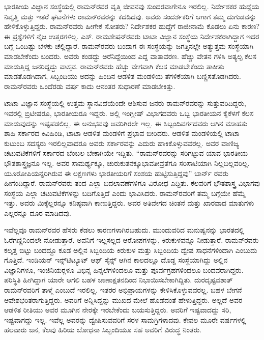 ಭಾರತೀಯ ವಿಜ್ಞಾನ ಸಂಸ್ಥೆಯಲ್ಲಿ ರಾಮನ್‍ರವರ ವೃತ್ತಿ ಜೀವನವು ಸುಂದರವಾಗೇನೂ ಇರಲಿಲ್ಲ. ನಿರ್ದೇಶಕರ ಹುದ್ದೆಯ ನಿವೃತ್ತಿ ಮತ್ತು ಇತರೆ ಘಟನೆಗಳು ರಾಮನ್‍ರವರನ್ನು ಕದಡಿದವು. ಅವರು ಸಂದರ್ಶಕರಿಗೆ ಆಗಾಗ ತಮ್ಮ ದುಗುಡವನ್ನು ಹೇಳಿಕೊಳ್ಳುತ್ತಿದ್ದರು. ರಾಮನ್‍ರವರು ಹೀಗೇಕೆ ಸೋತರು? ನಿರ್ದೇಶಕರ ಹುದ್ದೆಗೆ ರಾಜೀನಾಮೆ ಕೊಡಲು ಏನು ಕಾರಣ? ಈ ಪ್ರಶ್ನೆಗಳಿಗೆ ನೈಜ ಉತ್ತರಗಳಿಲ್ಲ. ಎಸ್. ರಾಮಶೇಷನ್‍ರವರು ಟಾಟಾ ವಿಜ್ಞಾನ ಸಂಸ್ಥೆಯ ನಿರ್ದೇಶಕರಾಗಿದ್ದಾಗ ಇದರ ಬಗ್ಗೆ ಒಂದಿಷ್ಟು ಬೆಳಕು ಚೆಲ್ಲಿದ್ದಾರೆ. ರಾಮನ್‍ರವರು ಬಂದಾಗ ಈ ಸಂಸ್ಥೆಯನ್ನು ಜಗತ್ತಿನಲ್ಲೇ ಅತ್ಯುತ್ತಮ ಸಂಸ್ಥೆಯಾಗಿ ಮಾಡಬೇಕೆಂದು ಬಂದರು. ಅವರು ಕಂಡದ್ದು ಅರೆನಿದ್ದೆಯಿಂದ ಎದ್ದ ವಾತಾವರಣ. ಹೆಚ್ಚು ವೇತನ ಗಳಿಸಿ ಅತ್ಯಲ್ಪ ಕೆಲಸ ಮಾಡುತ್ತಿದ್ದ ಜನರಿದ್ದದ್ದು ವಾಸ್ತವ. ರಾಮನ್‍ರವರು ಹೆಚ್ಚು ವೇಗವಾಗಿ ಕೆಲಸ ಮಾಡಬೇಕೆಂದು ತಾಕೀತು ಮಾಡತೊಡಗಿದಾಗ, ಸಿಬ್ಬಂದಿಯು ಅದನ್ನು ಹಿಂದಿನ ಆಡಳಿತ ಮಂಡಳಿಯ ತೆಗಳಿಕೆಯಾಗಿ ಬಣ್ಣಿಸತೊಡಗಿದರು. ರಾಮನ್‍ರವರು ಒಂದೆರಡು ವರ್ಷ ಕಾದು ಆನಂತರ ಸುಧಾರಣೆ ಮಾಡಬೇಕಿತ್ತು.

ಟಾಟಾ ವಿಜ್ಞಾನ ಸಂಸ್ಥೆಯಲ್ಲಿ ಉತ್ತಮ ಸ್ಥಾನವಿದೆಯೆಂದೇ ಆಶಿಸುವ ಜನರು ರಾಮನ್‍ರವರನ್ನು ಸುತ್ತುವರಿದಿದ್ದರು, ಇವರಲ್ಲಿ ಬ್ರಿಟೀಷರೂ, ಭಾರತೀಯರೂ ಇದ್ದರು. ಅಲ್ಲಿ ಇಂಗ್ಲೀಷ್ ವಿಭಾಗದವರು ಒಬ್ಬ ಭಾರತೀಯನ ಕೈಕೆಳಗೆ ಕೆಲಸ ಮಾಡುವುದನ್ನು ಇಷ್ಟಪಡಲಿಲ್ಲ. ಈ ಅನುಭವವು ಅವರಿಗಿರಲೇ ಇಲ್ಲ. ಈ ಸಿಬ್ಬಂದಿವರ್ಗದವರು ಆಗಿನ ವಸಾಹತು ಶಾಹಿ ಸರ್ಕಾರದ ಕಿವಿಹಿಂಡಿ, ಟಾಟಾ ಆಡಳಿತ ಮಂಡಳಿಗೆ ಪ್ರಭಾವ ಬೀರಿದರು. ಆಡಳಿತ ಮಂಡಳಿಯಲ್ಲಿ ಟಾಟಾ ಕುಟುಂಬ ಸದಸ್ಯರು ಇರಲಿಲ್ಲವಾದರೂ ಅವರು ಸರ್ಕಾರವನ್ನು ಎದುರು ಹಾಕಿಕೊಳ್ಳುವವರಲ್ಲ. ಅವರ ವಾಣಿಜ್ಯ ಚಟುವಟಿಕೆಗಳಿಗೆ ಸರ್ಕಾರದ ಬೆಂಬಲ ಬೇಕಾಗಿಯೇ ಇದ್ದಿತು. “ರಾಮನ್‍ರವರನ್ನು ಸರಿಗಟ್ಟುವ ಯಾವ ಭಾರತೀಯ ಭೌತಶಾಸ್ತ್ರಜ್ಞನೂ ಇಲ್ಲ. ಅವರ ಸಾಮರ್ಥ್ಯಕ್ಕೂ, ಚುರುಕುತನಕ್ಕೂ\break ಭಾವತೀವ್ರತೆಗೂ ಸರಿಸಾಟಿಯಾಗಿ ನಿಲ್ಲಬಲ್ಲವರಿಲ್ಲ. ಯೂರೋಪಿಯನ್ನರಿಗಿರುವ ಈ ಲಕ್ಷಣಗಳು ಭಾರತೀಯರಿಗೆ ಸಂಶಯ ಹುಟ್ಟಿಸುತ್ತಿದ್ದವು”  ಬಾರ್ನ್ ರವರು ಹೀಗೆಂದಿದ್ದಾರೆ. ರಾಮನ್‍ರವರು ತಂದ ಎಲ್ಲಾ ಬದಲಾವಣೆಗಳಿಗೂ ವಿರೋಧ ಎದ್ದಿತು. ಕೆಲವರಿಗೆ ಭೌತಶಾಸ್ತ್ರ ವಿಭಾಗವು ಸಂಸ್ಥೆಯ ಎಲ್ಲಾ ಚಟುವಟಿಕೆಗಳನ್ನು ಬದಿಗೊತ್ತಿದೆ ಎಂದು ಭಾವಿಸಿದರು. ರಾಮನ್‍ರವರಿಗೆ ತಮ್ಮ ಬಗ್ಗೆಯೇ ಹೆಮ್ಮೆ ಇತ್ತು. ಅವರು ಮಿಕ್ಕೆಲ್ಲರನ್ನೂ ಕನಿಷ್ಠವಾಗಿ ಕಾಣುತ್ತಿದ್ದರು. ಅವರ ಅತಿವೇಗದ ಚಿಂತನೆ ಮತ್ತು ಖಾರವಾದ ಮಾತುಗಳು ಎಲ್ಲರನ್ನೂ ದೂರ ಮಾಡಿದವು.

ಇವೆಲ್ಲವೂ ರಾಮನ್‍ರವರ ಹೆಸರು ಕೆಡಲು ಕಾರಣಗಳಾಗಿರಬಹುದು. ಮುಂದುವರಿದ ಮನುಷ್ಯನನ್ನು ಭಾರತದಲ್ಲಿ ಓರೆಗಣ್ಣಿನಿಂದಲೇ ನೋಡುತ್ತಾರೆ. ಅವನಿಗೆ ಇಲ್ಲಸಲ್ಲದ ಆರೋಪಗಳನ್ನು, ಕಿರುಕುಳವನ್ನೂ ನೀಡುತ್ತಾರೆ. ರಾಮನ್‍ರವರು ಕಲ್ಕತ್ತ ಬಿಟ್ಟು ಬಂದದ್ದೂ ಕೂಡ ಅಲ್ಲಿನ ಸಿಬ್ಬಂದಿಯ ಕಿರುಕುಳ ಮತ್ತು ಸಿಬ್ಬಂದಿಯ ದ್ವೇಷ ಸಾಧನೆಗಳಿಂದಾಗಿ ಎಂಬುದು ಗೊತ್ತಿದೆ. ಇಂಡಿಯನ್ ಇನ್ಸ್‌ಟಿಟ್ಯೂಟ್ ಆಫ್ ಸೈನ್ಸ್ ಆಗಿನ ಕಾಲದಲ್ಲೂ ದೊಡ್ಡ ಸಂಸ್ಥೆಯಾಗಿದ್ದು ಅಲ್ಲಿನ ವಿಜ್ಞಾನಿಗಳೂ, ಇಂಜಿನಿಯರ್‍ಗಳೂ ವಿಭಿನ್ನ ಹಿನ್ನಲೆಗಳಿಂದಲೂ ಮತ್ತು ಪೂರ್ವಗ್ರಹಗಳಿಂದಲೂ ಬಂದವರಾಗಿದ್ದರು. ಪರಿಸ್ಥಿತಿ ಹೀಗಿದ್ದಾಗ ಯಾರೇ ಆಗಲಿ ಬಹಳ ಚಾಣಾಕ್ಷತನದಿಂದ ನಿಭಾಯಿಸಬೇಕಾಗಿದ್ದಿತು. ದುರದೃಷ್ಟ\-ವಶಾತ್ ರಾಮನ್‍ರವರಿಗೆ ತಾಳ್ಮೆ ಎಂಬುದೆ ಇರಲಿಲ್ಲ. ಇತರರ ಅಭಿಪ್ರಾಯಗಳನ್ನು ಕೇಳಿಸಿ\-ಕೊಳ್ಳುವವರಲ್ಲ. ಬಹಳ ಬೇಗನೆ ಆವೇಶಭರಿತರಾಗುತ್ತಿದ್ದರು. ಅವರಿಗೆ ಅನ್ನಿಸಿದ್ದನ್ನು ಮುಖದ ಮೇಲೆ ಹೊಡೆದಂತೆ ಹೇಳುತ್ತಿದ್ದರು. ಅಲ್ಲದೆ ಅವರ ಆಡಳಿತ ರೀತಿಯು ಅವರ ಮೂಗಿನ ನೇರಕ್ಕೇ ಇರಬೇಕೆಂದು ಬಯಸುತ್ತಿದ್ದರು. ಅವರಿಗೆ ಇಷ್ಟವಾದದ್ದು ಸರಿ, ಇಷ್ಟವಾಗದ್ದು ಇಲ್ಲ. ಇವೆಲ್ಲ ಅವರನ್ನು ದ್ವೇಷಿಸುವವರಿಗೆ ಸರಳ ಸಾಮಗ್ರಿಗಳಾದವು. ಕೇವಲ ಮೂರೇ ವರ್ಷಗಳಲ್ಲಿ ಹಲವಾರು ಜನ, ಕೆಲವು ಹಿರಿಯ ಬೋಧನಾ ಸಿಬ್ಬಂದಿಯೂ ಸಹ ಅವರಿಗೆ ವಿರುದ್ಧ ನಿಂತರು.

